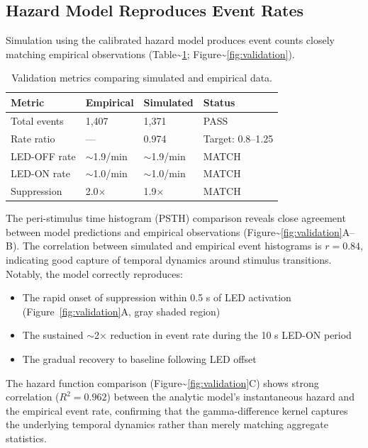 \documentclass[
  11pt,
  letterpaper,
]{article}
\begin{document}
\subsection{Hazard Model Reproduces Event Rates}

Simulation using the calibrated hazard model produces event counts
closely matching empirical observations
(Table\textasciitilde{}\ref{tab:validation};
Figure\textasciitilde{}\ref{fig:validation}).

\begin{table}[h]
\centering
\caption{Validation metrics comparing simulated and empirical data.}
\label{tab:validation}
\begin{tabular}{llll}
\hline
\textbf{Metric} & \textbf{Empirical} & \textbf{Simulated} & \textbf{Status} \\
\hline
Total events & 1,407 & 1,371 & PASS \\
Rate ratio & --- & 0.974 & Target: 0.8--1.25 \\
LED-OFF rate & $\sim$1.9/min & $\sim$1.9/min & MATCH \\
LED-ON rate & $\sim$1.0/min & $\sim$1.0/min & MATCH \\
Suppression & 2.0$\times$ & 1.9$\times$ & MATCH \\
\hline
\end{tabular}
\end{table}

The peri-stimulus time histogram (PSTH) comparison reveals close
agreement between model predictions and empirical observations
(Figure\textasciitilde{}\ref{fig:validation}A--B). The correlation
between simulated and empirical event histograms is \(r = 0.84\),
indicating good capture of temporal dynamics around stimulus
transitions. Notably, the model correctly reproduces:

\begin{itemize}
    \item The rapid onset of suppression within 0.5 s of LED activation (Figure~\ref{fig:validation}A, gray shaded region)
    \item The sustained $\sim$2$\times$ reduction in event rate during the 10 s LED-ON period
    \item The gradual recovery to baseline following LED offset
\end{itemize}

The hazard function comparison
(Figure\textasciitilde{}\ref{fig:validation}C) shows strong correlation
(\(R^2 = 0.962\)) between the analytic model's instantaneous hazard and
the empirical event rate, confirming that the gamma-difference kernel
captures the underlying temporal dynamics rather than merely matching
aggregate statistics.
\end{document}
